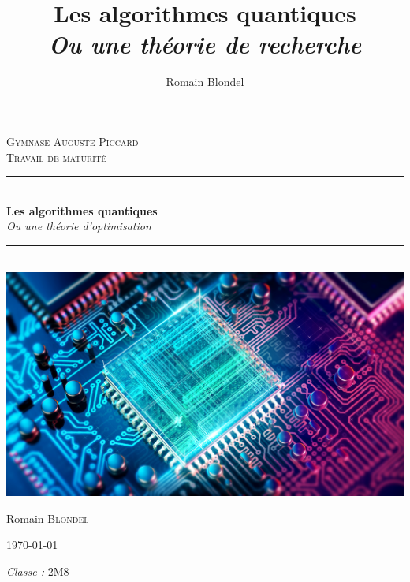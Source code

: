 \documentclass[11pt]{report}
\title{\textbf{Les algorithmes quantiques} \\ \textit{Ou une théorie de recherche}}
\author{Romain Blondel}
\affil{Gymnase Auguste Piccard}
\newcommand{\HRule}{\rule{\linewidth}{0.5mm}}
\begin{document}

\begin{titlepage}
  \begin{sffamily}
  \begin{center}

    \textsc{\LARGE Gymnase Auguste Piccard}\\[2cm]

    \textsc{\Large Travail de maturité}\\[1.5cm]

    \HRule \\[0.4cm]
    { \huge \textbf{Les algorithmes quantiques} \\ \textit{Ou une théorie d'optimisation} \\[0.4cm] }

    \HRule \\[2cm]
    \includegraphics[scale=0.2]{Images/illustration.jpg}
    \\[2cm]

	\vspace*{\fill}

    \begin{minipage}{0.3\textwidth}
      \begin{flushleft} \large
        Romain \textsc{Blondel}\\
      \end{flushleft}
    \end{minipage}
    \begin{minipage}{0.3\textwidth}
      \centering
      \today
    \end{minipage}
    \begin{minipage}{0.3\textwidth}
      \begin{flushright} \large
        \emph{Classe :} \textsc{2M8}\\
      \end{flushright}
    \end{minipage}

  \end{center}
  \end{sffamily}
\end{titlepage}
\end{document}
